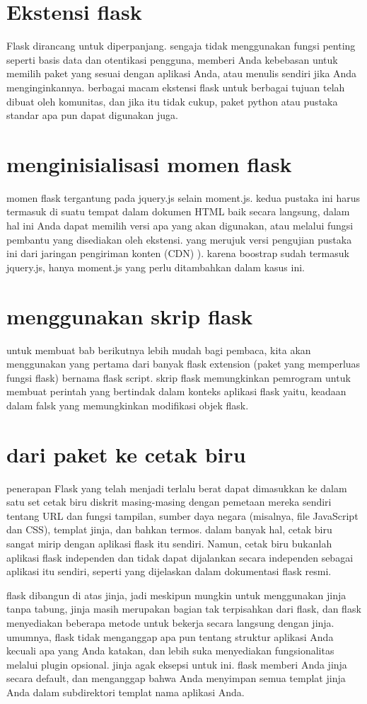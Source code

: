 \section{Ekstensi flask}
Flask  dirancang untuk diperpanjang. sengaja tidak menggunakan fungsi penting seperti basis data dan otentikasi pengguna, memberi Anda 
kebebasan untuk memilih paket yang sesuai dengan aplikasi Anda, atau menulis sendiri jika Anda menginginkannya. berbagai macam ekstensi 
flask untuk berbagai tujuan telah dibuat oleh komunitas, dan jika itu tidak cukup, paket python atau pustaka standar apa pun dapat 
digunakan juga.

\section{menginisialisasi momen flask}
momen flask tergantung pada jquery.js selain moment.js. kedua pustaka ini harus termasuk di suatu tempat dalam dokumen HTML baik secara 
langsung, dalam hal ini Anda dapat memilih versi apa yang akan digunakan, atau melalui fungsi pembantu yang disediakan oleh ekstensi. 
yang merujuk versi pengujian pustaka ini dari jaringan pengiriman konten (CDN) ). karena boostrap sudah termasuk jquery.js, hanya 
moment.js yang perlu ditambahkan dalam kasus ini.

\section{menggunakan skrip flask}
untuk membuat bab berikutnya lebih mudah bagi pembaca, kita akan menggunakan yang pertama dari banyak flask extension (paket yang 
memperluas fungsi flask) bernama flask script. skrip flask memungkinkan pemrogram untuk membuat perintah yang bertindak dalam konteks 
aplikasi flask yaitu, keadaan dalam falsk yang memungkinkan modifikasi objek flask.

\section{dari paket ke cetak biru}
penerapan Flask yang telah menjadi terlalu berat dapat dimasukkan ke dalam satu set cetak biru diskrit masing-masing dengan pemetaan 
mereka sendiri tentang URL dan fungsi tampilan, sumber daya negara (misalnya, file JavaScript dan CSS), templat jinja, dan bahkan 
termos. dalam banyak hal, cetak biru sangat mirip dengan aplikasi flask itu sendiri. Namun, cetak biru bukanlah aplikasi flask 
independen dan tidak dapat dijalankan secara independen sebagai aplikasi itu sendiri, seperti yang dijelaskan dalam dokumentasi flask 
resmi.

flask dibangun di atas jinja, jadi meskipun mungkin untuk menggunakan jinja tanpa tabung, jinja masih merupakan bagian tak terpisahkan 
dari flask, dan flask menyediakan beberapa metode untuk bekerja secara langsung dengan jinja. umumnya, flask tidak menganggap apa pun 
tentang struktur aplikasi Anda kecuali apa yang Anda katakan, dan lebih suka menyediakan fungsionalitas melalui plugin opsional. jinja 
agak eksepsi untuk ini. flask memberi Anda jinja secara default, dan menganggap bahwa Anda menyimpan semua templat jinja Anda dalam 
subdirektori templat nama aplikasi Anda.

